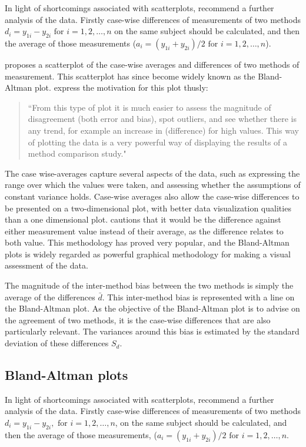 \documentclass[Main.tex]{subfiles}
\begin{document}
In light of shortcomings associated with scatterplots, \citet*{BA83} recommend a further analysis of the data. Firstly
case-wise differences of measurements of two methods $d_{i} = 	y_{1i}-y_{2i} \mbox{ for }i=1,2,\dots,n$ on the same subject
should be calculated, and then the average of those measurements ($a_{i} = (y_{1i} + y_{2i})/2 \mbox{ for }i=1,2,\dots, n$).

\citet{BA83} proposes a scatterplot of the case-wise averages and differences of two methods of measurement. This scatterplot has since become widely known as the Bland-Altman plot. \citet*{BA83} express the motivation for this plot thusly:
\begin{quote}
	``From this type of plot it is much easier to assess the magnitude
	of disagreement (both error and bias), spot outliers, and see
	whether there is any trend, for example an increase in (difference) for high values. This way of plotting the data is a very powerful way of displaying the results of a method comparison study."
\end{quote}

The case wise-averages capture several aspects of the data, such as expressing the range over which the values were taken, and assessing whether the assumptions of constant variance holds.
Case-wise averages also allow the case-wise differences to be presented on a two-dimensional plot, with better data visualization qualities than a one dimensional plot. \citet{BA86}
cautions that it would be the difference against either measurement value instead of their average, as the difference relates to both value. This methodology has proved very popular, and the Bland-Altman plots is widely regarded as powerful graphical methodology for making a visual assessment of the data.

The magnitude of the inter-method bias between the two methods is simply the average of the differences $\bar{d}$. This inter-method bias is represented with a line on the Bland-Altman plot. As the objective of the Bland-Altman plot is to advise on the agreement of two methods, it is the case-wise differences that are also particularly relevant. The variances around this bias is estimated by the standard deviation of these differences $S_{d}$.


	\subsection{Bland-Altman plots}
	
	In light of shortcomings associated with scatterplots,
	\citet*{BA83} recommend a further analysis of the data. Firstly
	case-wise differences of measurements of two methods $d_{i} =
	y_{1i}-y_{2i}, \mbox{ for }i=1,2,\dots,n$, on the same subject
	should be calculated, and then the average of those measurements, 
	($a_{i} = (y_{1i} + y_{2i})/2 \mbox{ for }i=1,2,\dots, n$.
	
\end{document}
